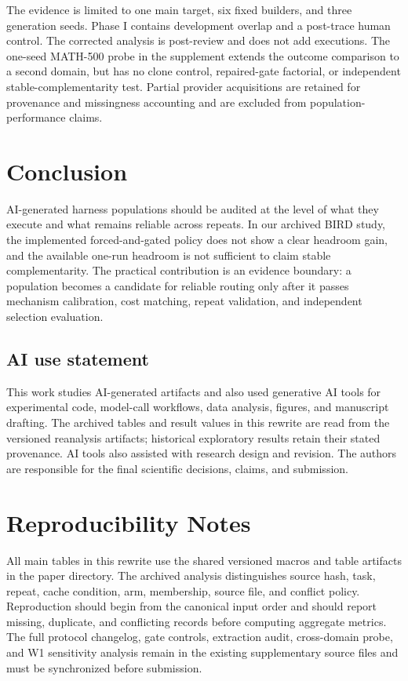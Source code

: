 \documentclass{article}
\begin{document}
The evidence is limited to one main target, six fixed builders, and three
generation seeds. Phase I contains development overlap and a post-trace human
control. The corrected analysis is post-review and does not add executions.
The one-seed MATH-500 probe in the supplement extends the outcome comparison to
a second domain, but has no clone control, repaired-gate factorial, or
independent stable-complementarity test. Partial provider acquisitions are
retained for provenance and missingness accounting and are excluded from
population-performance claims.

\section{Conclusion}

AI-generated harness populations should be audited at the level of what they
execute and what remains reliable across repeats. In our archived BIRD study,
the implemented forced-and-gated policy does not show a clear headroom gain,
and the available one-run headroom is not sufficient to claim stable
complementarity. The practical contribution is an evidence boundary: a
population becomes a candidate for reliable routing only after it passes
mechanism calibration, cost matching, repeat validation, and independent
selection evaluation.

\subsection*{AI use statement}
This work studies AI-generated artifacts and also used generative AI tools for
experimental code, model-call workflows, data analysis, figures, and
manuscript drafting. The archived tables and result values in this rewrite are
read from the versioned reanalysis artifacts; historical exploratory results
retain their stated provenance. AI tools also assisted with research design and
revision. The authors are responsible for the final scientific decisions,
claims, and submission.




\appendix
\section{Reproducibility Notes}

All main tables in this rewrite use the shared versioned macros and table
artifacts in the paper directory. The archived analysis distinguishes source
hash, task, repeat, cache condition, arm, membership, source file, and conflict
policy. Reproduction should begin from the canonical input order and should
report missing, duplicate, and conflicting records before computing aggregate
metrics. The full protocol changelog, gate controls, extraction audit,
cross-domain probe, and W1 sensitivity analysis remain in the existing
supplementary source files and must be synchronized before submission.
\end{document}
